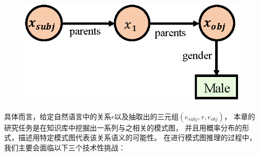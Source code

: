
\begin{figure}[ht]
\centering
\includegraphics[width=0.4\columnwidth]{figure/schema/intro.eps}
\label{fig:schema-intro}
\end{figure}

具体而言，给定自然语言中的关系$r$以及抽取出的三元组$(e_{subj}, r, e_{obj})$，
本章的研究任务是在知识库中挖掘出一系列与之相关的模式图，
并且用概率分布的形式，描述用特定模式图代表该关系语义的可能性。
在进行模式图推理的过程中，我们主要会面临以下三个技术性挑战：

